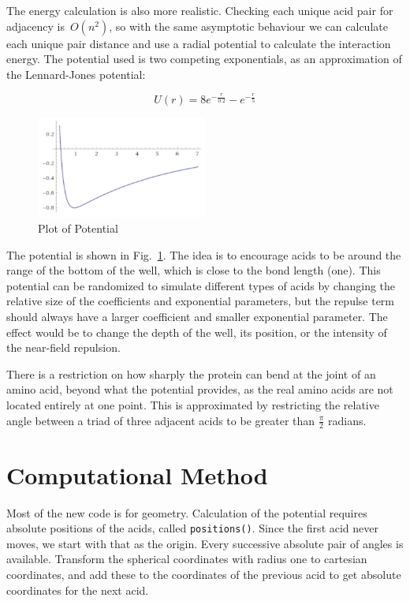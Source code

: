 \documentclass{article}
\begin{document}
	The energy calculation is also more realistic. Checking each unique acid pair for adjacency is~$O(n^2)$, so with the same asymptotic behaviour we can calculate each unique pair distance and use a radial potential to calculate the interaction energy. The potential used is two competing exponentials, as an approximation of the Lennard-Jones potential:

	\begin{equation}
		U(r) = 8 e^{-\frac{r}{0.2} } - e^{-\frac{r}{5} }
	\end{equation}

	\begin{figure}[h]
		\centering
		\includegraphics[width=0.5\textwidth]{expplot}
	    \caption{Plot of Potential}
		\label{fig:potential}
	\end{figure}
	
	The potential is shown in Fig.~\ref{fig:potential}. The idea is to encourage acids to be around the range of the bottom of the well, which is close to the bond length (one). This potential can be randomized to simulate different types of acids by changing the relative size of the coefficients and exponential parameters, but the repulse term should always have a larger coefficient and smaller exponential parameter. The effect would be to change the depth of the well, its position, or the intensity of the near-field repulsion.


	There is a restriction on how sharply the protein can bend at the joint of an amino acid, beyond what the potential provides, as the real amino acids are not located entirely at one point. This is approximated by restricting the relative angle between a triad of three adjacent acids to be greater than $\frac{\pi}{2} $ radians. 


\section{Computational Method}
	Most of the new code is for geometry. Calculation of the potential requires absolute positions of the acids, called \texttt{positions()}. Since the first acid never moves, we start with that as the origin. Every successive absolute pair of angles is available. Transform the spherical coordinates with radius one to cartesian coordinates, and add these to the coordinates of the previous acid to get absolute coordinates for the next acid. 
\end{document}
